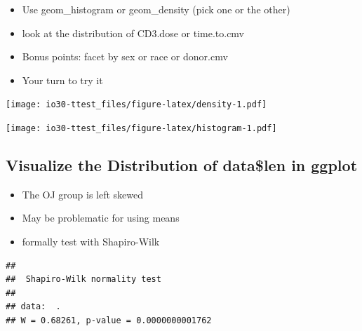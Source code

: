 \documentclass[
]{book}
\newenvironment{Shaded}{\begin{snugshade}}{\end{snugshade}}
\newcommand{\DataTypeTok}[1]{\textcolor[rgb]{0.13,0.29,0.53}{#1}}
\newcommand{\KeywordTok}[1]{\textcolor[rgb]{0.13,0.29,0.53}{\textbf{#1}}}
\newcommand{\NormalTok}[1]{#1}
\newcommand{\OperatorTok}[1]{\textcolor[rgb]{0.81,0.36,0.00}{\textbf{#1}}}
\newcommand{\StringTok}[1]{\textcolor[rgb]{0.31,0.60,0.02}{#1}}
\providecommand{\tightlist}{%
  \setlength{\itemsep}{0pt}\setlength{\parskip}{0pt}}
\begin{document}
\begin{itemize}
\tightlist
\item
  Use geom\_histogram or geom\_density (pick one or the other)
\item
  look at the distribution of CD3.dose or time.to.cmv
\item
  Bonus points: facet by sex or race or donor.cmv
\item
  Your turn to try it
\end{itemize}

\texttt{[image: io30-ttest\_files/figure-latex/density-1.pdf]}

\begin{Shaded}
\end{Shaded}

\texttt{[image: io30-ttest\_files/figure-latex/histogram-1.pdf]}

\hypertarget{visualize-the-distribution-of-datalen-in-ggplot}{%
\subsection{Visualize the Distribution of data\$len in ggplot}\label{visualize-the-distribution-of-datalen-in-ggplot}}

\begin{itemize}
\tightlist
\item
  The OJ group is left skewed
\item
  May be problematic for using means
\item
  formally test with Shapiro-Wilk
\end{itemize}

\begin{Shaded}
\end{Shaded}

\begin{verbatim}
## 
##  Shapiro-Wilk normality test
## 
## data:  .
## W = 0.68261, p-value = 0.0000000001762
\end{verbatim}
\end{document}
